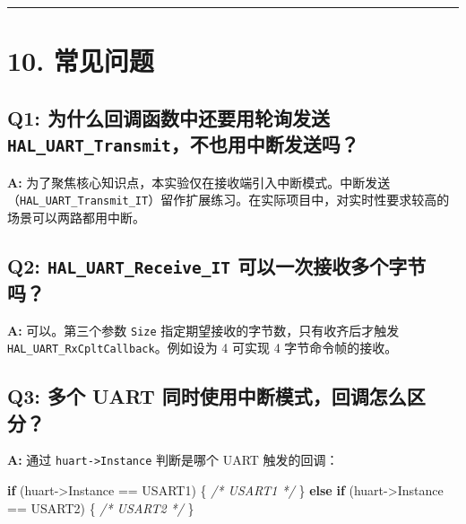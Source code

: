 \documentclass[
  chinese,
  UTF8,
  oneside,
  openany]{ctexbook}
\newenvironment{Shaded}{}{}
\newcommand{\CommentTok}[1]{\textcolor[rgb]{0.38,0.63,0.69}{\textit{#1}}}
\newcommand{\ControlFlowTok}[1]{\textcolor[rgb]{0.00,0.44,0.13}{\textbf{#1}}}
\newcommand{\NormalTok}[1]{#1}
\newcommand{\OperatorTok}[1]{\textcolor[rgb]{0.40,0.40,0.40}{#1}}
\begin{document}
\begin{center}\rule{0.5\linewidth}{0.5pt}\end{center}

\section{10. 常见问题}\label{ux5e38ux89c1ux95eeux9898-1}

\subsection{\texorpdfstring{Q1: 为什么回调函数中还要用轮询发送
\texttt{HAL\_UART\_Transmit}，不也用中断发送吗？}{Q1: 为什么回调函数中还要用轮询发送 HAL\_UART\_Transmit，不也用中断发送吗？}}\label{q1-ux4e3aux4ec0ux4e48ux56deux8c03ux51fdux6570ux4e2dux8fd8ux8981ux7528ux8f6eux8be2ux53d1ux9001-hal_uart_transmitux4e0dux4e5fux7528ux4e2dux65adux53d1ux9001ux5417}

\textbf{A:}
为了聚焦核心知识点，本实验仅在接收端引入中断模式。中断发送（\texttt{HAL\_UART\_Transmit\_IT}）留作扩展练习。在实际项目中，对实时性要求较高的场景可以两路都用中断。

\subsection{\texorpdfstring{Q2: \texttt{HAL\_UART\_Receive\_IT}
可以一次接收多个字节吗？}{Q2: HAL\_UART\_Receive\_IT 可以一次接收多个字节吗？}}\label{q2-hal_uart_receive_it-ux53efux4ee5ux4e00ux6b21ux63a5ux6536ux591aux4e2aux5b57ux8282ux5417}

\textbf{A:} 可以。第三个参数 \texttt{Size}
指定期望接收的字节数，只有收齐后才触发
\texttt{HAL\_UART\_RxCpltCallback}。例如设为 4 可实现 4
字节命令帧的接收。

\subsection{Q3: 多个 UART
同时使用中断模式，回调怎么区分？}\label{q3-ux591aux4e2a-uart-ux540cux65f6ux4f7fux7528ux4e2dux65adux6a21ux5f0fux56deux8c03ux600eux4e48ux533aux5206}

\textbf{A:} 通过 \texttt{huart-\textgreater{}Instance} 判断是哪个 UART
触发的回调：

\begin{Shaded}
\begin{Highlighting}[]
\ControlFlowTok{if} \OperatorTok{(}\NormalTok{huart}\OperatorTok{{-}\textgreater{}}\NormalTok{Instance }\OperatorTok{==}\NormalTok{ USART1}\OperatorTok{)} \OperatorTok{\{} \CommentTok{/* USART1 */} \OperatorTok{\}}
\ControlFlowTok{else} \ControlFlowTok{if} \OperatorTok{(}\NormalTok{huart}\OperatorTok{{-}\textgreater{}}\NormalTok{Instance }\OperatorTok{==}\NormalTok{ USART2}\OperatorTok{)} \OperatorTok{\{} \CommentTok{/* USART2 */} \OperatorTok{\}}
\end{Highlighting}
\end{Shaded}
\end{document}
